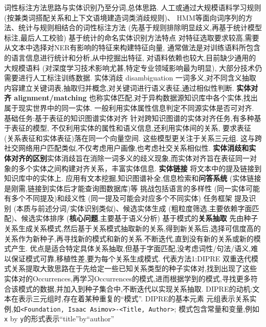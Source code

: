 \documentclass[10pt, utf8]{ctexart}
\begin{document}
\begin{multicols}{4}
    词性标注方法思路与实体识别乃至分词,总体思路.
    人工或通过大规模语料学习规则 (按兼类词搭配关系和上下文语境建造词类消歧规则)、
    HMM等面向词序列的方法、统计与规则相结合的词性标注方法 (先基于规则排除明显歧义,再基于统计模型标注,最后人工校验)
    {\color{blue}基于统计的命名实体识别方法特点}
    对特征选取要求较高,需要从文本中选择对NER有影响的特征来构建特征向量,
    通常做法是对训练语料所包含的语言信息进行统计和分析,从中挖掘出特征,
    对语料依赖也较大,目前缺少通用的大规模语料 (对深度学习技术影响尤甚,特定专业领域影响最为明显),
    大部分技术仍需要进行人工标注训练数据.
    {\color{blue}实体消歧 disambiguation}
    一词多义,对不同含义抽取内容建立关键词表,抽取归并概念,对关键词进行语义表征,通过相似性判断.
    {\color{purple_}\textbf{实体对齐 alignment/matching}}
    也称实体匹配,对于异构数据源知识库中各个实体,找出属于现实世界中的同一实体.
    一般利用实体属性信息判定不同源实体是否可对齐.
    {\color{blue}基础任务:基于表征的知识图谱实体对齐}
    针对跨知识图谱的实体对齐任务,有多种基于表征的模型,
    不仅利用实体的属性和语义信息,还利用实体间的关系,
    要求表征 (关系表征和实体表征)落在同一个向量空间.
    这些模型更关注于关系三元组.
    这与跨社交网络用户匹配类似,不仅考虑用户画像,也考虑社交关系相似性.
    {\color{purple_}\textbf{实体消歧和实体对齐的区别}}实体消歧旨在消除一词多义的歧义现象,而实体对齐旨在表征同一对象的多个实体之间构建对齐关系，丰富实体信息.
    {\color{purple_}\textbf{实体链接}}
    将文本中的提及链接到知识库中的实体上.
    应用有文本挖掘,知识图谱补全,信息检索和\textbf{问答系统} (实体链接是刚需,链接到实体后才能查询图数据库)等
    挑战包括语言的多样性 (同一实体可能有多个不同提及)和歧义性 (同一提及可能会对应多个不同实体)
    {\color{blue}任务框架}
    提及识别 (本质与前述分词/实体识别类似)、候选实体生成 (粗粒度筛选,主要依赖字面匹配)、候选实体排序 (\textbf{核心问题},主要基于语义分析)
    {\color{blue}基于模式的\color{purple_}\textbf{关系抽取}}
    先由种子关系生成关系模式,然后基于关系模式抽取新的关系,得到新关系后,选择可信度高的关系作为新种子,再寻找新的模式和新的关系.不断迭代,直到没有新的关系或新的模式产生.
    优点是适合特定具体关系抽取,但基于字面匹配,没考虑词性/句法/语义,难以保证模式可靠,移植性差,要为每个关系生成模式.
    {\color{red}代表方法1:DIPRE}
    双重迭代模式关系提取大致思路在于先给定一些已知关系类型的种子实体对,找到出现了这些实体对的Occurrences,再学习Occurrences的模式,进而根据学到的模式,寻找更多符合该模式的数据,并加入到种子集合中,不断迭代以实现关系抽取.
    DIPRE的动机:文本在表示三元组时,存在着某种重复的“模式”.
    {\color{blue} DIPRE的基本元素}
    元组表示关系实例,如\verb|<Foundation, Isaac Asimov>-<Title, Author>|;
    模式包含常量和变量,例如\verb|x| by \verb|y|的形式表示“title”by“author”

\end{multicols}
\end{document}
